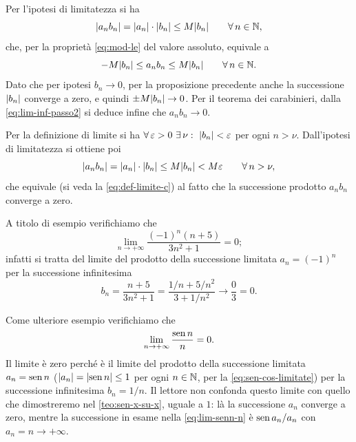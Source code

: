\begin{dimostrazione}
Per l'ipotesi di limitatezza si ha
\begin{equation}\label{eq:lim-inf-passo1}
  \lvert a_{n}b_{n}\rvert=\lvert a_{n}\rvert\cdot\lvert b_{n}\rvert\le M\lvert b_{n}\rvert \qquad\forall\, n\in\mathbb{N},
\end{equation}
che, per la proprietà \eqref{eq:mod-le} del valore assoluto, equivale a
\begin{equation}\label{eq:lim-inf-passo2}
  -M\lvert b_{n}\rvert\le a_{n}b_{n}\le M\lvert b_{n}\rvert \qquad\forall\, n\in\mathbb{N} .
\end{equation}
Dato che per ipotesi $b_{n}\to0$, per la proposizione precedente anche la successione
$\lvert b_{n}\rvert$ converge a zero, e quindi $\pm M\lvert b_{n}\rvert\to0$. Per il teorema dei
carabinieri, dalla \eqref{eq:lim-inf-passo2} si deduce infine che $a_{n}b_{n}\to0$.
\end{dimostrazione}

\begin{dimostrazione}
Per la definizione di limite si ha
$\perogni\epsilon>0\ \esiste\nu:\ \abs{b_{n}}<\epsilon$ per ogni $n>\nu$. Dall'ipotesi di
limitatezza si ottiene poi
\begin{equation}\label{eq:lim-inf-passo3}
  \lvert a_{n}b_{n}\rvert=\lvert a_{n}\rvert\cdot\lvert b_{n}\rvert\le M\lvert b_{n}\rvert<M\varepsilon \qquad\forall\, n>\nu,
\end{equation}
che equivale (si veda la \eqref{eq:def-limite-c}) al fatto che la successione prodotto
$a_{n}b_{n}$ converge a zero.
\end{dimostrazione}

\begin{esempio}
A titolo di esempio verifichiamo che
\begin{equation}\label{eq:es-limitata-inf}
  \lim_{n\to+\infty}\frac{(-1)^{n}(n+5)}{3n^{2}+1}=0;
\end{equation}
infatti si tratta del limite del prodotto della successione limitata $a_{n}=(-1)^{n}$
per la successione infinitesima
\begin{equation}\label{eq:es-limitata-inf-b}
  b_{n}=\frac{n+5}{3n^{2}+1}=\frac{1/n+5/n^{2}}{3+1/n^{2}}\to\frac03=0 .
\end{equation}
\end{esempio}

\begin{esempio}\label{es:senn-n}
Come ulteriore esempio verifichiamo che
\begin{equation}\label{eq:lim-senn-n}
  \lim_{n\to+\infty}\frac{\operatorname{sen} n}{n}=0 .
\end{equation}
Il limite è zero perché è il limite del prodotto della successione limitata
$a_{n}=\operatorname{sen} n$ ($\lvert a_{n}\rvert=\lvert \operatorname{sen} n\rvert\le1$ per ogni $n\in\mathbb{N}$, per la
\eqref{eq:sen-cos-limitate}) per la successione infinitesima $b_{n}=1/n$. Il lettore non
confonda questo limite con quello che dimostreremo nel \cref{teo:sen-x-su-x}, uguale a
$1$: là la successione $a_{n}$ converge a zero, mentre la successione in esame nella
\eqref{eq:lim-senn-n} è $\operatorname{sen} a_{n}/a_{n}$ con $a_{n}=n\to+\infty$.
\end{esempio}
